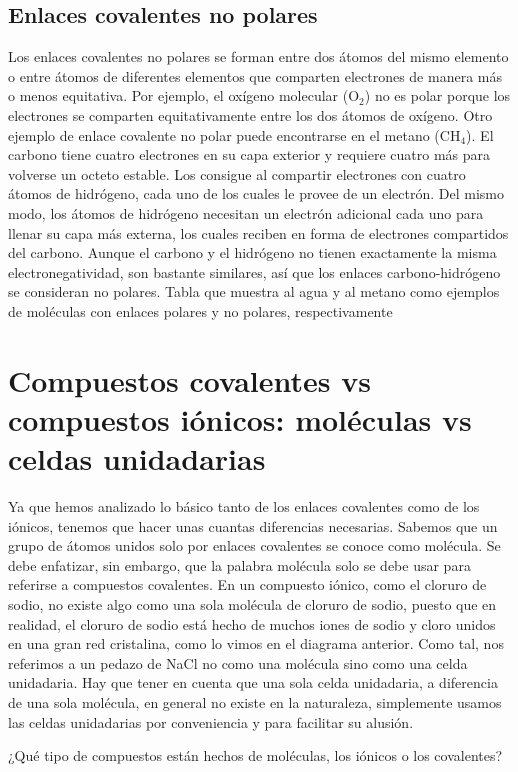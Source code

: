 \documentclass[12pt,addpoints,answers]{guia}
\begin{document}
\begin{questions}
    \subsection{Enlaces covalentes no polares}
    Los enlaces covalentes no polares se forman entre dos átomos del mismo elemento o entre átomos de diferentes elementos que comparten electrones de manera más o menos equitativa. Por ejemplo, el oxígeno molecular (O$_2$) no es polar porque los electrones se comparten equitativamente entre los dos átomos de oxígeno.
    Otro ejemplo de enlace covalente no polar puede encontrarse en el metano (CH$_4$). El carbono tiene cuatro electrones en su capa exterior y requiere cuatro más para volverse un octeto estable. Los consigue al compartir electrones con cuatro átomos de hidrógeno, cada uno de los cuales le provee de un electrón. Del mismo modo, los átomos de hidrógeno necesitan un electrón adicional cada uno para llenar su capa más externa, los cuales reciben en forma de electrones compartidos del carbono. Aunque el carbono y el hidrógeno no tienen exactamente la misma electronegatividad, son bastante similares, así que los enlaces carbono-hidrógeno se consideran no polares.
    Tabla que muestra al agua y al metano como ejemplos de moléculas con enlaces polares y no polares, respectivamente


    \section{Compuestos covalentes vs compuestos iónicos: moléculas vs celdas unidadarias}
    Ya que hemos analizado lo básico tanto de los enlaces covalentes como de los iónicos, tenemos que hacer unas cuantas diferencias necesarias. Sabemos que un grupo de átomos unidos solo por enlaces covalentes se conoce como molécula. Se debe enfatizar, sin embargo, que la palabra molécula solo se debe usar para referirse a compuestos covalentes. En un compuesto iónico, como el cloruro de sodio, no existe algo como una sola molécula de cloruro de sodio, puesto que en realidad, el cloruro de sodio está hecho de muchos iones de sodio y cloro unidos en una gran red cristalina, como lo vimos en el diagrama anterior. Como tal, nos referimos a un pedazo de NaCl no como una molécula sino como una celda unidadaria. Hay que tener en cuenta que una sola celda unidadaria, a diferencia de una sola molécula, en general no existe en la naturaleza, simplemente usamos las celdas unidadarias por conveniencia y para facilitar su alusión.

    ¿Qué tipo de compuestos están hechos de moléculas, los iónicos o los covalentes?


\end{questions}
\end{document}
